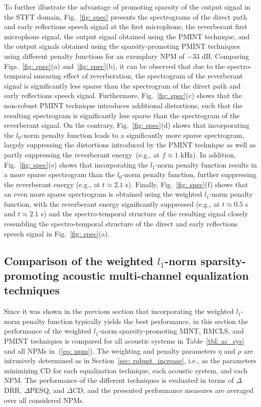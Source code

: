 \documentclass[10pt]{IEEEtran}
\begin{document}
To further illustrate the advantage of promoting sparsity of the output signal in the STFT domain, Fig.~\ref{fig: spec} presents the spectrograms of the direct path and early reflections speech signal at the first microphone, the reverberant first microphone signal, the output signal obtained using the PMINT technique, and the output signals obtained using the sparsity-promoting PMINT techniques using different penalty functions for an exemplary NPM of $-33$ dB.
Comparing Figs.~\ref{fig: spec}(a) and~\ref{fig: spec}(b), it can be observed that due to the spectro-temporal smearing effect of reverberation, the spectrogram of the reverberant signal is significantly less sparse than the spectrogram of the direct path and early reflections speech signal.
Furthermore, Fig.~\ref{fig: spec}(c) shows that the non-robust PMINT technique introduces additional distortions, such that the resulting spectrogram is significantly less sparse than the spectrogram of the reverberant signal.
On the contrary, Fig.~\ref{fig: spec}(d) shows that incorporating the $l_0$-norm penalty function leads to a significantly more sparse spectrogram, largely suppressing the distortions introduced by the PMINT technique as well as partly suppressing the reverberant energy~(e.g., at $f \approx 1$ kHz).
In addition, Fig.~\ref{fig: spec}(e) shows that incorporating the $l_1$-norm penalty function results in a more sparse spectrogram than the $l_0$-norm penalty function, further suppressing the reverberant energy (e.g., at $t \approx 2.1$ s).
Finally, Fig.~\ref{fig: spec}(f) shows that an even more sparse spectrogram is obtained using the weighted $l_1$-norm penalty function, with the reverberant energy significantly suppressed (e.g., at $t \approx 0.5$ s and $t \approx 2.1$ s) and the spectro-temporal structure of the resulting signal closely resembling the spectro-temporal structure of the direct and early reflections speech signal in Fig.~\ref{fig: spec}(a).

\subsection{Comparison of the weighted $l_1$-norm sparsity-promoting acoustic multi-channel equalization techniques}
\label{sec: wl1}
Since it was shown in the previous section that incorporating the weighted $l_1$-norm penalty function typically yields the best performance, in this section the performance of the weighted $l_1$-norm sparsity-promoting MINT, RMCLS, and PMINT techniques is compared for all acoustic systems in Table~\ref{tbl: ac_sys} and all NPMs in~(\ref{eq: npm}).
The weighting and penalty parameters $\eta$ and $\rho$ are intrusively determined as in Section~\ref{sec: robust_increase}, i.e., as the parameters minimizing CD for each equalization technique, each acoustic system, and each NPM.
The performance of the different techniques is evaluated in terms of $\Delta$DRR, $\Delta$PESQ, and $\Delta$CD, and the presented performance measures are averaged over all considered NPMs. 
\end{document}
